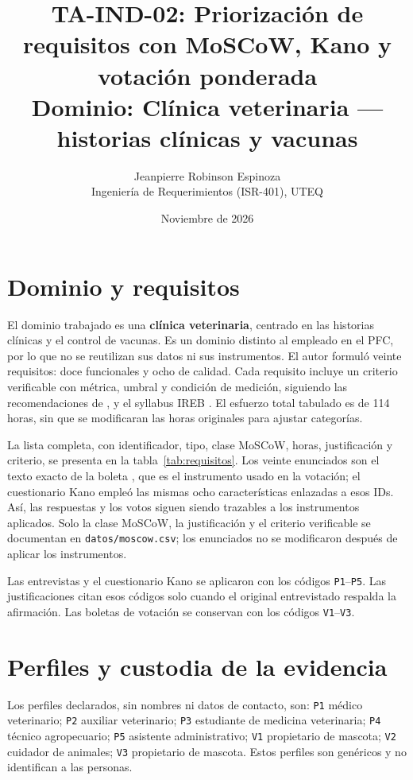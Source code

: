 \documentclass[11pt,a4paper]{article}
\title{TA-IND-02: Priorización de requisitos con MoSCoW, Kano y votación ponderada\\
\large Dominio: Clínica veterinaria --- historias clínicas y vacunas}
\author{Jeanpierre Robinson Espinoza\\
Ingeniería de Requerimientos (ISR-401), UTEQ}
\date{Noviembre de 2026}
\begin{document}
\maketitle

\section{Dominio y requisitos}
El dominio trabajado es una \textbf{clínica veterinaria}, centrado en las historias clínicas y el control de vacunas. Es un dominio distinto al empleado en el PFC, por lo que no se reutilizan sus datos ni sus instrumentos. El autor formuló veinte requisitos: doce funcionales y ocho de calidad. Cada requisito incluye un criterio verificable con métrica, umbral y condición de medición, siguiendo las recomendaciones de \cite{wiegers2013}, \cite{iso29148} y el syllabus IREB \cite{ireb2026}. El esfuerzo total tabulado es de 114 horas, sin que se modificaran las horas originales para ajustar categorías.

La lista completa, con identificador, tipo, clase MoSCoW, horas, justificación y criterio, se presenta en la tabla~\ref{tab:requisitos}. Los veinte enunciados son el texto exacto de la boleta , que es el instrumento usado en la votación; el cuestionario Kano empleó las mismas ocho características enlazadas a esos IDs. Así, las respuestas y los votos siguen siendo trazables a los instrumentos aplicados. Solo la clase MoSCoW, la justificación y el criterio verificable se documentan en \texttt{datos/moscow.csv}; los enunciados no se modificaron después de aplicar los instrumentos.



Las entrevistas y el cuestionario Kano se aplicaron con los códigos \texttt{P1}--\texttt{P5}. Las justificaciones citan esos códigos solo cuando el original entrevistado respalda la afirmación. Las boletas de votación se conservan con los códigos \texttt{V1}--\texttt{V3}.

\section{Perfiles y custodia de la evidencia}
Los perfiles declarados, sin nombres ni datos de contacto, son: \texttt{P1} médico veterinario; \texttt{P2} auxiliar veterinario; \texttt{P3} estudiante de medicina veterinaria; \texttt{P4} técnico agropecuario; \texttt{P5} asistente administrativo; \texttt{V1} propietario de mascota; \texttt{V2} cuidador de animales; \texttt{V3} propietario de mascota. Estos perfiles son genéricos y no identifican a las personas.
\end{document}
